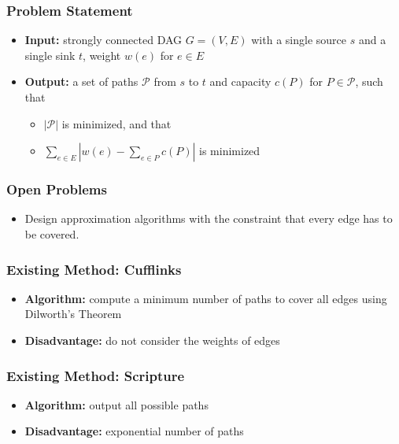 \frame
{
	\frametitle{Problem Statement}

	\begin{itemize}
	\item {\bf Input:} strongly connected DAG $G=(V,E)$ with a single source $s$ and a single sink $t$,
		weight $w(e)$ for $e\in E$

	\vspace{0.2cm}

	\item {\bf Output:} a set of paths $\mathcal{P}$ from $s$ to $t$ and capacity $c(P)$ for $P\in\mathcal{P}$, such that
		\begin{itemize}
		\item $|\mathcal{P}|$ is minimized, and that
		\item $\sum_{e\in E} | w(e) - \sum_{e\in P} c(P)|$ is minimized
		\end{itemize}
	\end{itemize}

	\vspace{1.0cm}
	
	\vspace{1.0cm}
}

\frame
{
	\frametitle{Open Problems}
	\begin{itemize}
	\item Design approximation algorithms with the constraint that every edge has to be covered.
	\end{itemize}
}

\frame
{
	\frametitle{Existing Method: Cufflinks}

	\begin{itemize}
	\item {\bf Algorithm:} compute a minimum number of paths to cover all edges using Dilworth's Theorem
	\vspace{0.5cm}
	\item {\bf Disadvantage:} do not consider the weights of edges
	\end{itemize}
}

\frame
{
	\frametitle{Existing Method: Scripture}
	\begin{itemize}
	\item {\bf Algorithm:} output all possible paths
	\vspace{0.5cm}
	\item {\bf Disadvantage:} exponential number of paths
	\end{itemize}
}


